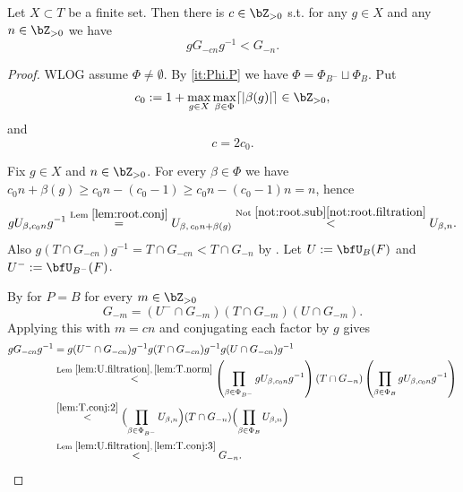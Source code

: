 \documentclass[12pt,a4paper]{amsart}%
\newcommand{\claude}[1]{{{#1}}}
\newcommand{\RamiD}[1]{{{#1}}}
\newcommand{\RamiE}[1]{{{#1}}}
\begin{document}
\begin{lemma}\label{lem:T.conj}
Let $X\subset T$ be a finite set. Then there is $c\in\Z_{>0}$ s.t. for any $g\in X$ and any $n\in\Z_{>0}$ we have
$$gG_{-cn}g^{-1}<G_{-n}.$$
\end{lemma}
\begin{proof}
\RamiE{WLOG \claude{assume} $\Phi\neq \emptyset$.}
By \eqref{it:Phi.P} we have $\Phi=\Phi_{B^-}\sqcup\Phi_{B}$. Put
$$c_\RamiD{0}:=1+\max_{g\in X}\max_{\beta\in\Phi}\lceil |\beta(g)|\rceil\in\Z_{>0},$$
and
$$c=2c_0.$$

Fix $g\in X$ and $n\in\Z_{>0}$. For every $\beta\in\Phi$ we have $c_\RamiD{0}n+\beta(g)\geq c_\RamiD{0}n-(c_\RamiD{0}-1)\geq c_\RamiD{0}n-(c_\RamiD{0}-1)n=n$, hence
\begin{equation}\label{lem:T.conj:2}
gU_{\beta,c_\RamiD{0}n}g^{-1}\overset{\text{Lem }\ref{lem:root.conj}}{=}U_{\beta,\,c_\RamiD{0}n+\beta(g)}\overset{\text{Not }\ref{not:root.sub}\eqref{not:root.filtration}}{<}U_{\beta,n}.
\end{equation}
Also $g(T\cap G_{-cn})g^{-1}=T\cap G_{-cn}<T\cap G_{-n}$ \claude{by }.
\RamiD{Let $U:=\bfU_B(F)$ and $U^-:=\bfU_{B^-}(F)$.}

By  for $P=B$
for every $m\in\Z_{>0}$
\begin{equation}\label{lem:T.conj:3}
    \RamiD{G_{-m}=(U^-\cap G_{-m})(T\cap G_{-m})(U\cap G_{-m}).}
    \end{equation}
Applying this with $m=cn$ and conjugating each factor by $g$ gives
\RamiD{
\begin{align*}
gG_{-cn}g^{-1}&=
g(U^-\cap G_{-cn})g^{-1} g(T\cap G_{-cn})g^{-1} g(U\cap G_{-cn})g^{-1}\\
&\overset{\text{Lem }\ref{lem:U.filtration},\,\ref{lem:T.norm}}{<}
\left(\prod_{\beta\in\Phi_{B^-}}gU_{\beta,c_0n}g^{-1}\right)
(T\cap G_{-n})
\left(\prod_{\beta\in\Phi_B}gU_{\beta,c_0n}g^{-1}\right)\\
&\overset{\eqref{lem:T.conj:2}}{<}\Bigl(\prod_{\beta\in\Phi_{B^-}}U_{\beta,n}\Bigr)(T\cap G_{-n})\Bigl(\prod_{\beta\in\Phi_{B}}U_{\beta,n}\Bigr)\\
&\overset{\text{Lem }\ref{lem:U.filtration},\,\eqref{lem:T.conj:3}}{<}G_{-n}.
\end{align*}
}
\end{proof}
\end{document}
